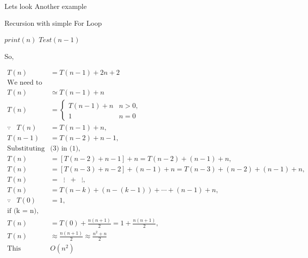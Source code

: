\documentclass[]{article}
\theoremstyle{plain}
\theoremstyle{definition}
\begin{document}
Lets look Another example
\begin{algorithm}[H]
    \caption{Recursion with simple For Loop}
    \label{printRecursion}
    \begin{algorithmic}
         
             
                \State$print(n)$ 
            \EndFor
            \State$Test(n-1)$  
        \EndIf
        \EndProcedure
    \end{algorithmic}
\end{algorithm}

So,

\[
\begin{aligned}
    T(n) &= T(n - 1) + 2n + 2\\
    \text{We need to take Asymptotic Notation}\\
    T(n) &\simeq  T(n - 1) + n\\
    T(n) &=
    \begin{cases}
        T(n - 1) + n \label{base} & n > 0, \\
        1 & n = 0
    \end{cases} \\
    \because \hspace{10pt} T(n) &= T(n - 1) + n, \\
    T(n - 1) &= T(n - 2) + n - 1, \\
    \text{Substituting} & \text{(3) in (1)}, \\
    T(n) &= [T(n - 2) + n - 1] + n = T(n - 2) + (n-1) + n, \\
    T(n) &= [T(n - 3) + n - 2] + (n-1) + n = T(n - 3) + (n-2) + (n-1) + n, \\
    T(n) &= \hspace{7pt}\vdots \hspace{7pt}+\hspace{7pt} \vdots, \\
    T(n) &= T(n - k) + (n-(k - 1 )) + \cdots + (n-1) + n, \\
    \because \hspace{10pt} T(0) &= 1, \\
    \text{if (k = n)}, \\
    T(n) &= T(0) + \frac{n(n+1)}{2} = 1 + \frac{n(n+1)}{2}, \\
    T(n) &\approx \frac{n(n+1)}{2}  \approx \frac{n^2+n}{2}\\
    \text{This algorithm is } & O(n^2)
\end{aligned}
\]
\end{document}
